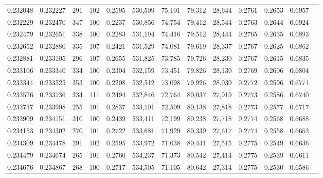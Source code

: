 \begin{tabular}{rrrrrrrrrrrrr}
0.232048 & 0.232227 &   291 & 102 &                                     0.2595 & 530,509 &  75,101 &  79,312 &  28,644 & 0.2761 & 0.2653 & 0.6957 \\
0.232229 & 0.232470 &   347 & 100 &                                     0.2237 & 530,856 &  74,754 &  79,412 &  28,544 & 0.2763 & 0.2644 & 0.6924 \\
0.232479 & 0.232651 &   338 & 100 &                                     0.2283 & 531,194 &  74,416 &  79,512 &  28,444 & 0.2765 & 0.2635 & 0.6893 \\
0.232652 & 0.232880 &   335 & 107 &                                     0.2421 & 531,529 &  74,081 &  79,619 &  28,337 & 0.2767 & 0.2625 & 0.6862 \\
0.232881 & 0.233105 &   296 & 107 &                                     0.2655 & 531,825 &  73,785 &  79,726 &  28,230 & 0.2767 & 0.2615 & 0.6835 \\
0.233106 & 0.233340 &   334 & 100 &                                     0.2304 & 532,159 &  73,451 &  79,826 &  28,130 & 0.2769 & 0.2606 & 0.6804 \\
0.233344 & 0.233525 &   353 & 100 &                                     0.2208 & 532,512 &  73,098 &  79,926 &  28,030 & 0.2772 & 0.2596 & 0.6771 \\
0.233526 & 0.233736 &   334 & 111 &                                     0.2494 & 532,846 &  72,764 &  80,037 &  27,919 & 0.2773 & 0.2586 & 0.6740 \\
0.233737 & 0.233908 &   255 & 101 &                                     0.2837 & 533,101 &  72,509 &  80,138 &  27,818 & 0.2773 & 0.2577 & 0.6717 \\
0.233909 & 0.234151 &   310 & 100 &                                     0.2439 & 533,411 &  72,199 &  80,238 &  27,718 & 0.2774 & 0.2568 & 0.6688 \\
0.234153 & 0.234302 &   270 & 101 &                                     0.2722 & 533,681 &  71,929 &  80,339 &  27,617 & 0.2774 & 0.2558 & 0.6663 \\
0.234309 & 0.234478 &   291 & 102 &                                     0.2595 & 533,972 &  71,638 &  80,441 &  27,515 & 0.2775 & 0.2549 & 0.6636 \\
0.234479 & 0.234674 &   265 & 101 &                                     0.2760 & 534,237 &  71,373 &  80,542 &  27,414 & 0.2775 & 0.2539 & 0.6611 \\
0.234676 & 0.234867 &   268 & 100 &                                     0.2717 & 534,505 &  71,105 &  80,642 &  27,314 & 0.2775 & 0.2530 & 0.6586 \\

\end{tabular}
